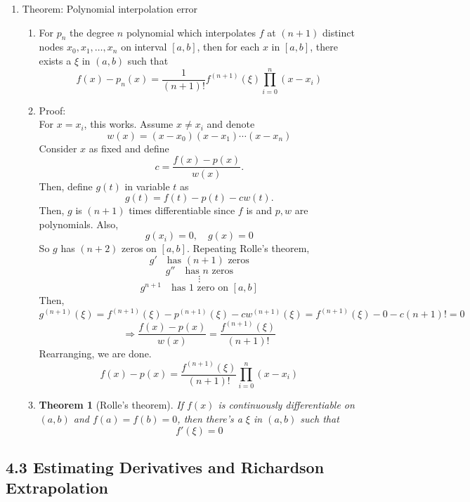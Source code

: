 \documentclass{article}
\newtheorem{thm}{Theorem}[section]
\theoremstyle{remark}
\begin{document}
\begin{enumerate}
\item Theorem: Polynomial interpolation error
\begin{enumerate}
\item For $p_n$ the degree $n$ polynomial which interpolates $f$ at $(n+1)$ distinct nodes $x_0, x_1, \dots, x_n$ on interval $[a,b]$, then for each $x$ in $[a,b]$, there exists a $\xi$ in $(a,b)$ such that 
\[
f(x)- p_n(x) = \frac{1}{(n+1)!} f^{(n+1)}(\xi) \prod_{i=0}^n (x-x_i)
\]
\item Proof: \\
For $x=x_i$, this works. Assume $x\neq x_i$ and denote
\[
w(x) = (x-x_0)(x-x_1)\cdots (x-x_n)
\]
Consider $x$ as fixed and define
\[
c = \frac{f(x)-p(x)}{w(x)}.
\]
Then, define $g(t)$ in variable $t$ as
\[
g(t) = f(t)-p(t)-cw(t).
\]
Then, $g$ is $(n+1)$ times differentiable since $f$ is and $p,w$ are polynomials. Also,
\[
g(x_i)=0, \quad g(x)=0
\]
So $g$ has $(n+2)$ zeros on $[a,b]$. Repeating Rolle's theorem, 
\[
g' \quad \text{has $(n+1)$ zeros}
\]
\[
g'' \quad \text{has $n$ zeros}
\]
\[
\vdots
\]
\[
g^{n+1} \quad \text{has $1$ zero on $[a,b]$}
\]
Then,
\[
g^{(n+1)}(\xi) = f^{(n+1)}(\xi) - p^{(n+1)}(\xi) - cw^{(n+1)}(\xi) = f^{(n+1)}(\xi) - 0 - c(n+1)! = 0
\]
\[
\Rightarrow \frac{f(x)-p(x)}{w(x)} = \frac{f^{(n+1)}(\xi)}{(n+1)!}
\]
Rearranging, we are done.
\[
f(x) - p(x) = \frac{f^{(n+1)}(\xi)}{(n+1)!}\prod_{i=0}^n (x-x_i)
\]

\item \begin{thm}[Rolle's theorem]
If $f(x)$ is continuously differentiable on $(a,b)$ and $f(a) = f(b) = 0$, then there's a $\xi$ in $(a,b)$ such that 
$$
f'(\xi) = 0
$$
\end{thm}

\end{enumerate}

\end{enumerate}


\subsection{4.3 Estimating Derivatives and Richardson Extrapolation }


\end{document}
